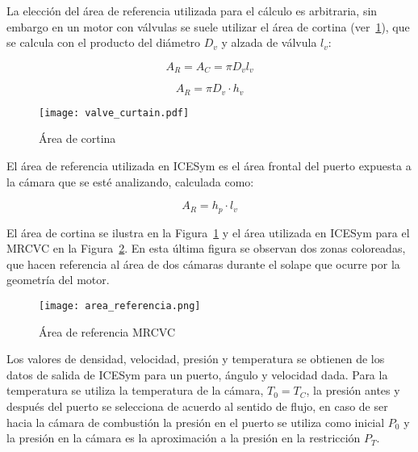 La elección del área de referencia utilizada para el cálculo es arbitraria, sin
embargo en un motor con válvulas se suele utilizar el área de cortina
(ver~\ref{fig:area_cortina}), que se calcula con el producto del diámetro
$D_{v}$ y alzada de válvula $l_{v}$:

\begin{equation} \label{eq:area_cortina}
  A_R = A_C = \pi D_v l_v
\end{equation}

\begin{equation}\label{eq:ar_cortina}
  A_{R}=\pi D_{v} \cdot h_{v}
\end{equation}


\begin{figure} \centering
\texttt{[image: valve\_curtain.pdf]}
  \caption{Área de cortina}\label{fig:area_cortina}
\end{figure}

El área de referencia utilizada en ICESym es el área frontal del puerto expuesta
a la cámara que se esté analizando, calculada como:

\begin{equation}\label{eq:ar_mrcvc}
  A_{R} = h_{p} \cdot l_{v}
\end{equation}

El área de cortina se ilustra en la Figura~\ref{fig:area_cortina} y el área
utilizada en ICESym para el MRCVC en la Figura~\ref{fig:area_referencia}.
%
En esta última figura se observan dos zonas coloreadas, que hacen referencia al
área de dos cámaras durante el solape que ocurre por la geometría del motor.

\begin{figure}
  \centering
  \texttt{[image: area\_referencia.png]}
  \caption{Área de referencia MRCVC}\label{fig:area_referencia}
\end{figure}

Los valores de densidad, velocidad, presión y temperatura se obtienen de los
datos de salida de ICESym para un puerto, ángulo y velocidad dada.
%
Para la temperatura se utiliza la temperatura de la cámara, $T_0 = T_C$, la
presión antes y después del puerto se selecciona de acuerdo al sentido de flujo,
en caso de ser hacia la cámara de combustión la presión en el puerto se utiliza
como inicial $P_0$ y la presión en la cámara es la aproximación a la presión en
la restricción $P_T$.

